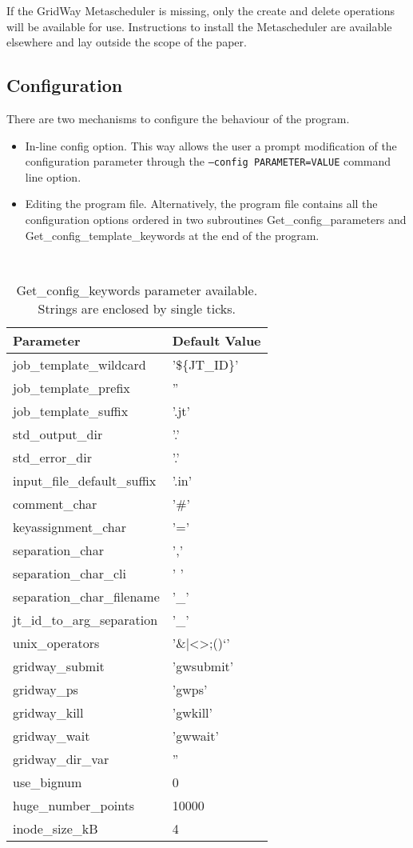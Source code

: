 \documentclass[12pt,a4paper]{article}
\begin{document}
If the GridWay Metascheduler is missing, only the create and delete operations will be available for use. Instructions to install the Metascheduler are available elsewhere\cite{gridwayinstall} and lay outside the scope of the paper.

\subsection{Configuration}
There are two mechanisms to configure the behaviour of the program.
\begin{itemize}
\item In-line config option. This way allows the user a prompt modification of the configuration parameter through the {\tt --config PARAMETER=VALUE} command line option.
\item Editing the program file. Alternatively, the program file contains all the configuration options ordered in two subroutines Get\_config\_\-parameters and Get\_config\_template\_keywords at the end of the program.
\end{itemize}
\begin{table}
\center
{\tt
\begin{tabular}{ll}
\hline
\textrm{Parameter } &  \textrm{Default Value}\\
\hline
	job\_template\_wildcard & '\$\{JT\_ID\}'\\
	job\_template\_prefix & ''\\
	job\_template\_suffix & '.jt'\\
	std\_output\_dir & '.'\\
	std\_error\_dir & '.'\\
	input\_file\_default\_suffix & '.in'\\
	comment\_char & '\#'\\
	keyassignment\_char & '='\\
	separation\_char & ','\\
	separation\_char\_cli & ' '\\
	separation\_char\_filename & '\_'\\
	jt\_id\_to\_arg\_separation & '\_'\\
    unix\_operators & '\&|<>;()`'\\
	gridway\_submit & 'gwsubmit'\\
	gridway\_ps & 'gwps'\\
	gridway\_kill & 'gwkill'\\
	gridway\_wait & 'gwwait'\\
	gridway\_dir\_var & ''\\
	use\_bignum & 0\\
	huge\_number\_points & 10000\\
	inode\_size\_kB & 4 \\
\hline
\end{tabular}
}
\caption{Get\_config\_keywords parameter available. Strings are enclosed by single ticks.}
\label{keyword}
\end{table}
\end{document}
